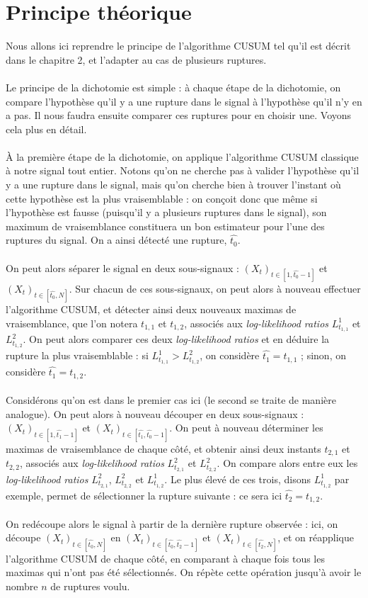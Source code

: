 \documentclass[french,11pt,notitlepage]{report}
\begin{document}
	\section{Principe théorique}
	Nous allons ici reprendre le principe de l'algorithme CUSUM tel qu'il est décrit dans le chapitre 2, et l'adapter au cas de plusieurs ruptures.
	\\ \\
	Le principe de la dichotomie est simple : à chaque étape de la dichotomie, on compare l'hypothèse qu'il y a une rupture dans le signal à l'hypothèse qu'il n'y en a pas. Il nous faudra ensuite comparer ces ruptures pour en choisir une. Voyons cela plus en détail.
	\\ \\
	À la première étape de la dichotomie, on applique l'algorithme CUSUM classique à notre signal tout entier. Notons qu'on ne cherche pas à valider l'hypothèse qu'il y a une rupture dans le signal, mais qu'on cherche bien à trouver l'instant où cette hypothèse est la plus vraisemblable : on conçoit donc que même si l'hypothèse est fausse (puisqu'il y a plusieurs ruptures dans le signal), son maximum de vraisemblance constituera un bon estimateur pour l'une des ruptures du signal. On a ainsi détecté une rupture, $\hat{t_0}$.
	\\ \\
	On peut alors séparer le signal en deux sous-signaux : $(X_t)_{t \in [1, \hat{t_0}-1]}$ et $(X_t)_{t \in [\hat{t_0}, N]}$. Sur chacun de ces sous-signaux, on peut alors à nouveau effectuer l'algorithme CUSUM, et détecter ainsi deux nouveaux maximas de vraisemblance, que l'on notera $t_{1,1}$ et $t_{1,2}$, associés aux \textit{log-likelihood ratios} $L_{t_{1,1}}^1$ et $L_{t_{1,2}}^2$. On peut alors comparer ces deux \textit{log-likelihood ratios} et en déduire la rupture la plus vraisemblable : si $L_{t_{1,1}}^1 > L_{t_{1,2}}^2$, on considère $\hat{t_1} = t_{1,1}$ ; sinon, on considère $\hat{t_1} = t_{1,2}$.
	\\ \\
	Considérons qu'on est dans le premier cas ici (le second se traite de manière analogue). On peut alors à nouveau découper en deux sous-signaux : $(X_t)_{t \in [1, \hat{t_1}-1]}$ et $(X_t)_{t \in [\hat{t_1}, \hat{t_0}-1]}$. On peut à nouveau déterminer les maximas de vraisemblance de chaque côté, et obtenir ainsi deux instants $t_{2,1}$ et $t_{2,2}$, associés aux \textit{log-likelihood ratios} $L_{t_{2,1}}^2$ et $L_{t_{2,2}}^2$. On compare alors entre eux les \textit{log-likelihood ratios} $L_{t_{2,1}}^2$, $L_{t_{2,2}}^2$ et $L_{t_{1,2}}^1$. Le plus élevé de ces trois, disons $L_{t_{1,2}}^1$ par exemple, permet de sélectionner la rupture suivante : ce sera ici $\hat{t_2} = t_{1,2}$.
	\\ \\
	On redécoupe alors le signal à partir de la dernière rupture observée : ici, on découpe $(X_t)_{t \in [\hat{t_0}, N]}$ en $(X_t)_{t \in [\hat{t_0}, \hat{t_2}-1]}$ et $(X_t)_{t \in [\hat{t_2}, N]}$, et on réapplique l'algorithme CUSUM de chaque côté, en comparant à chaque fois tous les maximas qui n'ont pas été sélectionnés. On répète cette opération jusqu'à avoir le nombre $n$ de ruptures voulu.
\end{document}

